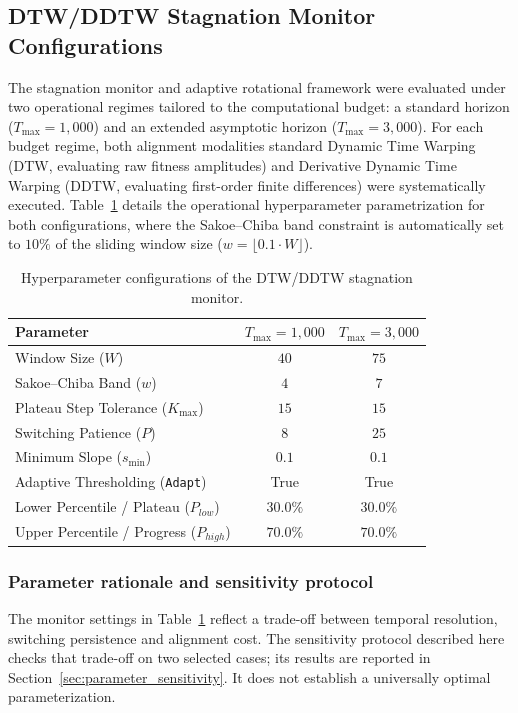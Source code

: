 \documentclass[review]{elsarticle}
\begin{document}
\subsection{DTW/DDTW Stagnation Monitor Configurations}
The stagnation monitor and adaptive rotational framework were evaluated under two operational regimes tailored to the computational budget: a standard horizon ($T_{\max} = 1,000$) and an extended asymptotic horizon ($T_{\max} = 3,000$). For each budget regime, both alignment modalities standard Dynamic Time Warping (DTW, evaluating raw fitness amplitudes) and Derivative Dynamic Time Warping (DDTW, evaluating first-order finite differences) were systematically executed. Table~\ref{tab:dtw_parameters} details the operational hyperparameter parametrization for both configurations, where the Sakoe--Chiba band constraint is automatically set to $10\%$ of the sliding window size ($w = \lfloor 0.1 \cdot W \rfloor$).
\begin{table}[htbp]
\centering
\caption{Hyperparameter configurations of the DTW/DDTW stagnation monitor.}
\label{tab:dtw_parameters}
\begin{tabular}{lcc}
\hline
\textbf{Parameter} & \textbf{$T_{\max}=1,000$} & \textbf{$T_{\max}=3,000$} \\ \hline
Window Size ($W$) & $40$ & $75$ \\
Sakoe--Chiba Band ($w$) & $4$ & $7$ \\
Plateau Step Tolerance ($K_{\max}$) & $15$ & $15$ \\
Switching Patience ($P$) & $8$ & $25$ \\
Minimum Slope ($s_{\min}$) & $0.1$ & $0.1$ \\
Adaptive Thresholding (\texttt{Adapt}) & True & True \\
Lower Percentile / Plateau ($P_{low}$) & $30.0\%$ & $30.0\%$ \\
Upper Percentile / Progress ($P_{high}$) & $70.0\%$ & $70.0\%$ \\ \hline
\end{tabular}
\end{table}

\subsubsection{Parameter rationale and sensitivity protocol}
\label{sec:parameter_justification}

The monitor settings in Table~\ref{tab:dtw_parameters} reflect a trade-off
between temporal resolution, switching persistence and alignment cost.
The sensitivity protocol described here checks that trade-off on two selected
cases; its results are reported in Section~\ref{sec:parameter_sensitivity}.
It does not establish a universally optimal parameterization.
\end{document}

